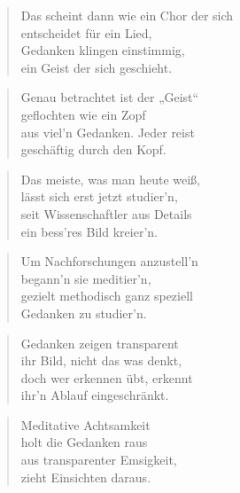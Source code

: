 \documentclass[10pt,a4paper]{article}
\begin{document}
\begin{multicols}{2}
\begin{verse}
Das scheint dann wie ein Chor der sich \\
entscheidet für ein Lied, \\
Gedanken klingen einstimmig, \\
ein Geist der sich geschieht. \\
\end{verse}

\begin{verse}
Genau betrachtet ist der „Geist“ \\
geflochten wie ein Zopf \\
aus viel’n Gedanken. Jeder reist \\
geschäftig durch den Kopf. \\
\end{verse}

\begin{verse}
Das meiste, was man heute weiß, \\
lässt sich erst jetzt studier’n, \\
seit Wissenschaftler aus Details \\
ein bess’res Bild kreier’n. \\
\end{verse}

\begin{verse}
Um Nachforschungen anzustell’n \\
begann’n sie meditier’n, \\
gezielt methodisch ganz speziell \\
Gedanken zu studier’n. \\
\end{verse}

\begin{verse}
Gedanken zeigen transparent \\
ihr Bild, nicht das was denkt, \\
doch wer erkennen übt, erkennt \\
ihr’n Ablauf eingeschränkt. \\
\end{verse}

\begin{verse}
Meditative Achtsamkeit \\
holt die Gedanken raus \\
aus transparenter Emsigkeit, \\
zieht Einsichten daraus. \\
\end{verse}


\end{multicols}
\end{document}
